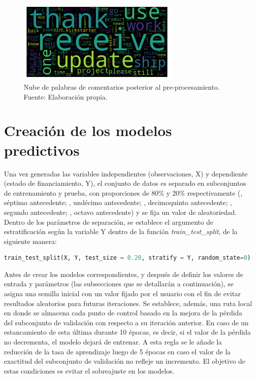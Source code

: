 \begin{figure}[!ht]
	\begin{center}
		\includegraphics[width=0.7\textwidth]{4/figures/comments_wordcloud_processed.png}
		\caption{Nube de palabras de comentarios posterior al pre-procesamiento. Fuente: Elaboración propia.}
		\label{4:fig34}
	\end{center}
\end{figure}

\section{Creación de los modelos predictivos}
Una vez generadas las variables independientes (observaciones, X) y dependiente (estado de financiamiento, Y), el conjunto de datos es separado en subconjuntos de entrenamiento y prueba, con proporciones de 80\% y 20\% respectivamente (\citeauthor{pr_yuan2016textanalytics}, séptimo antecedente; \citeauthor{pr_yu2018deeplearning}, undécimo antecedente; \citeauthor{pr_chen2019keywords_crowdfunding}, decimoquinto antecedente; \citeauthor{pr_mitra2014phrases}, segundo antecedente; \citeauthor{pr_sawhney2016usingLT}, octavo antecedente) y se fija un valor de aleatoriedad. Dentro de los parámetros de separación, se establece el argumento de estratificación según la variable Y dentro de la función \textit{train\_test\_split}, de la siguiente manera:

\begin{lstlisting}[language=Python]
train_test_split(X, Y, test_size = 0.20, stratify = Y, random_state=0)
\end{lstlisting}

Antes de crear los modelos correspondientes, y después de definir los valores de entrada y parámetros (las subsecciones que se detallarán a continuación), se asigna una semilla inicial con un valor fijado por el usuario con el fin de evitar resultados aleatorios para futuras iteraciones. Se establece, además, una ruta local en donde se almacena cada punto de control basado en la mejora de la pérdida del subconjunto de validación con respecto a su iteración anterior. En caso de un estancamiento de esta última durante 10 épocas, es decir, si el valor de la pérdida no decrementa, el modelo dejará de entrenar. A esta regla se le añade la reducción de la tasa de aprendizaje luego de 5 épocas en caso el valor de la exactitud del subconjunto de validación no refleje un incremento. El objetivo de estas condiciones es evitar el sobreajuste en los modelos.

